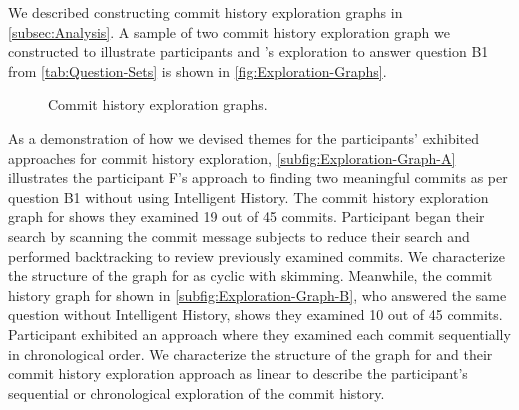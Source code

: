 We described constructing commit history exploration graphs in \autoref{subsec:Analysis}. 
A sample of two commit history exploration graph we constructed to illustrate participants  and ’s exploration to answer question B1 from \autoref{tab:Question-Sets} is shown in \autoref{fig:Exploration-Graphs}.

\begin{figure}[h]
  \centering%
  \qquad
  \caption{
    Commit history exploration graphs.
  }%
  \label{fig:Exploration-Graphs}%
\end{figure}

As a demonstration of how we devised themes for the participants' exhibited approaches for commit history exploration, \autoref{subfig:Exploration-Graph-A} illustrates the participant F's approach to finding two meaningful commits as per question B1 without using Intelligent History.
The commit history exploration graph for  shows they examined 19 out of 45 commits.
Participant  began their search by scanning the commit message subjects to reduce their search and performed backtracking to review previously examined commits.
We characterize the structure of the graph for  as cyclic with skimming.
Meanwhile, the commit history graph for  shown in \autoref{subfig:Exploration-Graph-B}, who answered the same question without Intelligent History, shows they examined 10 out of 45 commits.
Participant  exhibited an approach where they examined each commit sequentially in chronological order.
We characterize the structure of the graph for  and their commit history exploration approach as linear to describe the participant's sequential or chronological exploration of the commit history.

